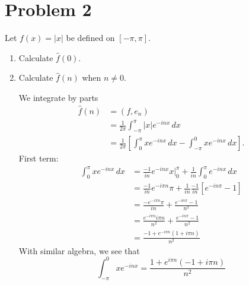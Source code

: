 \documentclass[11pt]{article}
\begin{document}
\newpage
\section*{Problem 2}
\begin{problem}
    Let $f(x) = |x|$ be defined on $[-\pi, \pi].$
    \begin{enumerate}
        \item Calculate $\hat{f}(0).$
        \item Calculate $\hat{f}(n)$ when $n \neq 0.$
        \begin{solution}
    We integrate by parts
\begin{align*}
    \hat{f}(n) &= (f,e_n)\\
    &= \frac{1}{2\pi}\int_{-\pi}^\pi |x|e^{-inx}\,dx\\
    &= \frac{1}{2\pi}\left[\int_0^\pi x e^{-inx}\,dx - \int_{-\pi}^0 x e^{-inx}\, dx\right].
\end{align*}
First term:
\begin{align*}
    \int_0^\pi x e^{-inx}\,dx &= \frac{-1}{in}e^{-inx}x\bigg|_0^{\pi} + \frac{1}{in}\int_0^\pi e^{-inx}\,dx\\
    &=\frac{-1}{in}e^{-i\pi n}\pi + \frac{1}{in}\frac{-1}{in}\left[e^{-in\pi} - 1\right]\\
    &= \frac{-e^{-i\pi n}\pi}{in} + \frac{e^{-in \pi} -1}{n^2}\\
    &= \frac{e^{-i\pi n} i \pi n}{n^2} + \frac{e^{-in \pi} -1}{n^2}\\
    &= \frac{-1 + e^{-i\pi n}(1 + i\pi n)}{n^2}
\end{align*}
With similar algebra, we see that 
\[\int_{-\pi}^0 x e^{-inx} = \frac{1 + e^{i\pi n}(-1 + i\pi n)}{n^2}\]


\end{solution}
\end{enumerate}
\end{problem}
\end{document}
